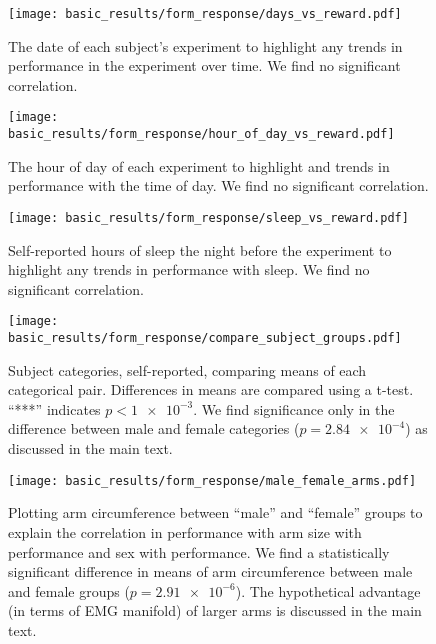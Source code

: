 \documentclass[../main.tex]{subfiles}
\begin{document}
\begin{figure}[!htb]%
    \centering
    \texttt{[image: basic\_results/form\_response/days\_vs\_reward.pdf]}
    \caption[Experiment day versus reward]{The date of each subject's experiment to highlight any trends in performance in the experiment over time. We find no significant correlation.}\label{fig:days_vs_reward}
\end{figure}

\begin{figure}[!htb]%
    \centering
    \texttt{[image: basic\_results/form\_response/hour\_of\_day\_vs\_reward.pdf]}
    \caption[Hour of day versus reward]{The hour of day of each experiment to highlight and trends in performance with the time of day. We find no significant correlation.}\label{fig:hour_of_day_vs_reward}
\end{figure}

\begin{figure}[!htb]%
    \centering
    \texttt{[image: basic\_results/form\_response/sleep\_vs\_reward.pdf]}
    \caption[Hours of sleep vs reward]{Self-reported hours of sleep the night before the experiment to highlight any trends in performance with sleep. We find no significant correlation.}\label{fig:sleep_vs_reward}
\end{figure}

\begin{figure}[!htb]%
    \centering
    \texttt{[image: basic\_results/form\_response/compare\_subject\_groups.pdf]}
    \caption[Subject group comparisons]{Subject categories, self-reported, comparing means of each categorical pair. Differences in means are compared using a t-test. ``***'' indicates $p<\num{1e-3}$. We find significance only in the difference between male and female categories ($p=\num{2.84e-4}$) as discussed in the main text.}\label{fig:compare_subject_groups}
\end{figure}

\begin{figure}[!htb]%
    \centering
    \texttt{[image: basic\_results/form\_response/male\_female\_arms.pdf]}
    \caption[Arm circumference and self-reported sex]{Plotting arm circumference between ``male'' and ``female'' groups to explain the correlation in performance with arm size with performance and sex with performance. We find a statistically significant difference in means of arm circumference between male and female groups ($p=\num{2.91e-6}$). The hypothetical advantage (in terms of EMG manifold) of larger arms is discussed in the main text.}\label{fig:male_female_arms}
\end{figure}
\end{document}
